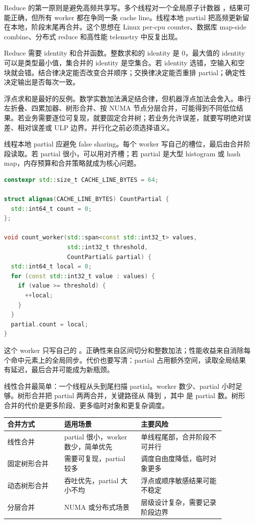 Reduce 的第一原则是避免高频共享写。多个线程对一个全局原子计数器 ，结果可能正确，但所有 worker 都在争同一条 cache line。线程本地 partial 把高频更新留在本地，阶段末尾再合并。这个思想在 Linux per-cpu counter、数据库 map-side combine、分布式 reduce 和高性能 telemetry 中反复出现。

Reduce 需要 identity 和合并函数。整数求和的 identity 是 0，最大值的 identity 可以是类型最小值，集合并的 identity 是空集合。若 identity 选错，空输入和空块就会错。结合律决定能否改变合并顺序；交换律决定能否重排 partial；确定性决定输出是否每次一致。

浮点求和是最好的反例。数学实数加法满足结合律，但机器浮点加法会舍入。串行左折叠、四累加器、树形合并、按 NUMA 节点分层合并，可能得到不同低位结果。若业务需要逐位可复现，就要固定合并树；若业务允许误差，就要写明绝对误差、相对误差或 ULP 边界。并行化之前必须选择语义。

线程本地 partial 应避免 false sharing。每个 worker 写自己的槽位，最后由合并阶段读取。若 partial 很小，可以用对齐槽；若 partial 是大型 histogram 或 hash map，内存预算和合并策略就成为核心问题。

\begin{lstlisting}[language=C++,caption={线程本地 partial 的基本形态}]
constexpr std::size_t CACHE_LINE_BYTES = 64;

struct alignas(CACHE_LINE_BYTES) CountPartial {
  std::int64_t count = 0;
};

void count_worker(std::span<const std::int32_t> values,
                  std::int32_t threshold,
                  CountPartial& partial) {
  std::int64_t local = 0;
  for (const std::int32_t value : values) {
    if (value >= threshold) {
      ++local;
    }
  }
  partial.count = local;
}
\end{lstlisting}

这个 worker 只写自己的 。正确性来自区间切分和整数加法；性能收益来自消除每个命中元素上的全局同步。代价也要写清：partial 占用额外空间，读取全局结果有延迟，最后合并可能成为新瓶颈。

线性合并最简单：一个线程从头到尾扫描 partial。worker 数少、partial 小时足够。树形合并把 partial 两两合并，关键路径从  降到 ，其中  是 partial 数。树形合并的代价是更多阶段、更多临时对象和更复杂调度。

\begin{center}
\begin{tabular}{p{0.23\linewidth}p{0.31\linewidth}p{0.34\linewidth}}
\toprule
合并方式 & 适用场景 & 主要风险 \\
\midrule
线性合并 & partial 很小，worker 数少，简单优先 & 单线程尾部，合并阶段不可并行 \\
固定树形合并 & 需要可复现，partial 较多 & 调度自由度降低，临时对象更多 \\
动态树形合并 & 吞吐优先，partial 大小不均 & 浮点或顺序敏感结果可能不稳定 \\
分层合并 & NUMA 或分布式场景 & 层级设计复杂，需要记录阶段边界 \\
\bottomrule
\end{tabular}
\end{center}

